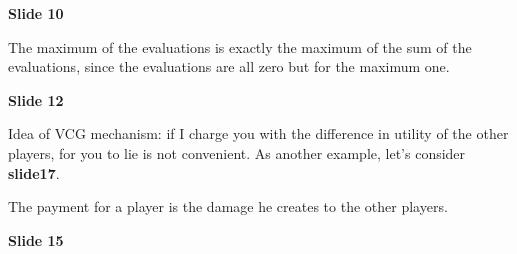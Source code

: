 \documentclass[pt11,a4paper,twoside,reqno,openright]{paper}
\begin{document}
\bigskip
\noindent \textbf{Slide 10}

\noindent The maximum of the evaluations is exactly the maximum of the sum of 
the evaluations, since the evaluations are all zero but for the maximum one.

\bigskip
\noindent \textbf{Slide 12}

\noindent Idea of VCG mechanism: if I charge you with the difference in utility 
of the other players, for you to lie is not convenient. As another example, 
let's consider \textbf{slide17}.

\noindent The payment for a player is the damage he creates to the other 
players.

\bigskip
\noindent \textbf{Slide 15}

\noindent 
\end{document}
